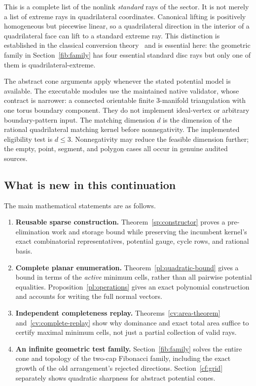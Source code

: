 This is a complete list of the nonlink \emph{standard} rays of the
sector.  It is not merely a list of extreme rays in quadrilateral
coordinates.  Canonical lifting is positively homogeneous but
piecewise linear, so a quadrilateral direction in the interior of a
quadrilateral face can lift to a standard extreme ray.  This distinction
is established in the classical conversion theory~\cite{Burton2009}
and is essential here: the geometric family in
Section~\ref{fib:family} has four essential standard disc rays but only
one of them is quadrilateral-extreme.

The abstract cone arguments apply whenever the stated potential model
is available.  The executable modules use the maintained native
validator, whose contract is narrower: a connected orientable finite
3-manifold triangulation with one torus boundary component.  They do
not implement ideal-vertex or arbitrary boundary-pattern input.
The matching dimension \(d\) is the dimension of the rational
quadrilateral matching kernel before nonnegativity.  The implemented
eligibility test is \(d\le3\).  Nonnegativity may reduce the feasible
dimension further; the empty, point, segment, and polygon cases all
occur in genuine audited sources.

\subsection{What is new in this continuation}

The main mathematical statements are as follows.

\begin{enumerate}
\item \textbf{Reusable sparse construction.}
Theorem~\ref{sp:constructor} proves a pre-elimination work and storage
bound while preserving the incumbent kernel's exact combinatorial
representatives, potential gauge, cycle rows, and rational basis.
\item \textbf{Complete planar enumeration.}
Theorem~\ref{pl:quadratic-bound} gives a bound in terms of the
\emph{active} minimum cells, rather than all pairwise potential
equalities.  Proposition~\ref{pl:operations} gives an exact polynomial
construction and accounts for writing the full normal vectors.
\item \textbf{Independent completeness replay.}
Theorems~\ref{cv:area-theorem} and~\ref{cv:complete-replay} show why
dominance and exact total area suffice to certify maximal minimum
cells, not just a partial collection of valid rays.
\item \textbf{An infinite geometric test family.}
Section~\ref{fib:family} solves the entire cone and topology of the
two-cap Fibonacci family, including the exact growth of the old
arrangement's rejected directions.  Section~\ref{cf:grid} separately
shows quadratic sharpness for abstract potential cones.
\end{enumerate}

